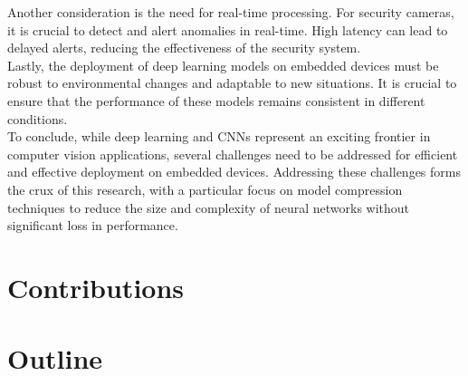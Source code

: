 Another consideration is the need for real-time processing. For security
cameras, it is crucial to detect and alert anomalies in real-time. High latency
can lead to delayed alerts, reducing the effectiveness of the security system.\\

Lastly, the deployment of deep learning models on embedded devices must be
robust to environmental changes and adaptable to new situations. It is crucial
to ensure that the performance of these models remains consistent in different
conditions.\\

To conclude, while deep learning and CNNs represent an exciting frontier in
computer vision applications, several challenges need to be addressed for
efficient and effective deployment on embedded devices. Addressing these
challenges forms the crux of this research, with a particular focus on model
compression techniques to reduce the size and complexity of neural networks
without significant loss in performance.\\


\section{Contributions}
\section{Outline}